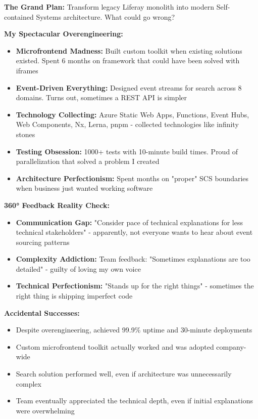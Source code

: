 \documentclass[10pt,a4paper]{article}
\begin{document}
\textbf{The Grand Plan:} Transform legacy Liferay monolith into modern Self-contained Systems architecture. What could go wrong?

\textbf{My Spectacular Overengineering:}
\begin{itemize}[leftmargin=10pt,itemsep=1pt]
\item \textbf{Microfrontend Madness:} Built custom toolkit when existing solutions existed. Spent 6 months on framework that could have been solved with iframes
\item \textbf{Event-Driven Everything:} Designed event streams for search across 8 domains. Turns out, sometimes a REST API is simpler
\item \textbf{Technology Collecting:} Azure Static Web Apps, Functions, Event Hubs, Web Components, Nx, Lerna, pnpm - collected technologies like infinity stones
\item \textbf{Testing Obsession:} 1000+ tests with 10-minute build times. Proud of parallelization that solved a problem I created
\item \textbf{Architecture Perfectionism:} Spent months on "proper" SCS boundaries when business just wanted working software
\end{itemize}

\textbf{360° Feedback Reality Check:}
\begin{itemize}[leftmargin=10pt,itemsep=1pt]
\item \textbf{Communication Gap:} "Consider pace of technical explanations for less technical stakeholders" - apparently, not everyone wants to hear about event sourcing patterns
\item \textbf{Complexity Addiction:} Team feedback: "Sometimes explanations are too detailed" - guilty of loving my own voice
\item \textbf{Technical Perfectionism:} "Stands up for the right things" - sometimes the right thing is shipping imperfect code
\end{itemize}

\textbf{Accidental Successes:}
\begin{itemize}[leftmargin=10pt,itemsep=1pt]
\item Despite overengineering, achieved 99.9\% uptime and 30-minute deployments
\item Custom microfrontend toolkit actually worked and was adopted company-wide
\item Search solution performed well, even if architecture was unnecessarily complex
\item Team eventually appreciated the technical depth, even if initial explanations were overwhelming
\end{itemize}
\end{document}
